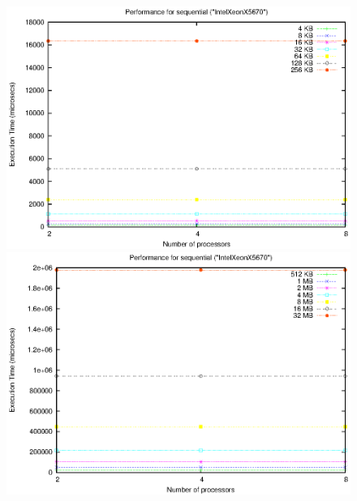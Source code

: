 \begin{figure}[t]
    \begin{center}
        \includegraphics[scale=0.6]{plots/test_01_IntelXeonX5670/NxTxM/sequential_IntelXeonX5670_NxTxM_small}
    \end{center}
    
    \begin{center}
        \includegraphics[scale=0.6]{plots/test_01_IntelXeonX5670/NxTxM/sequential_IntelXeonX5670_NxTxM_large}
    \end{center}
    

\end{figure}
